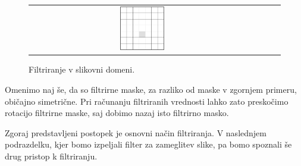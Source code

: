 \begin{primer}
\begin{figure}[htbp]
\begin{tabular}{cccc}
  \includegraphics[width=0.2\textwidth]{./slike-latex/filter4s}
  \end{tabular}
  \caption{Filtriranje v slikovni domeni.}
  \label{fig:filtriranje}
\end{figure}

\end{primer}
%
Omenimo naj še, da so filtrirne maske, za razliko od maske v zgornjem primeru, običajno simetrične. Pri računanju filtriranih vrednosti lahko zato preskočimo rotacijo filtrirne maske, saj dobimo nazaj isto filtrirno masko.

Zgoraj predstavljeni postopek je osnovni način filtriranja. V naslednjem podrazdelku, kjer bomo izpeljali filter za zameglitev slike, pa bomo spoznali še drug pristop k filtriranju.
%
